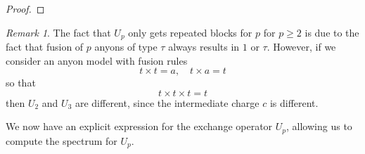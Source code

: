 \documentclass[a4paper,10pt,oneside]{book}
\theoremstyle{plain}
\theoremstyle{definition}
\theoremstyle{remark}
\newtheorem{remark}{Remark}[section]
\begin{document}
\begin{proof}
\end{proof}

\begin{remark}
  The fact that $U_p$ only gets repeated blocks for $p$ for $p \ge 2$ is due to the fact that fusion of $p$ anyons of type $τ$ always results in $1$ or $τ$. However, if we consider an anyon model with fusion rules
  \begin{equation}
    t \times t = a, \quad
    t \times a = t
  \end{equation}
  so that
  \begin{equation}
    t \times t \times t = t
  \end{equation}
  then $U_2$ and $U_3$ are different, since the intermediate charge $c$ is different.
\end{remark}

We now have an explicit expression for the exchange operator $U_p$, allowing us to compute the spectrum for $U_p$.
\end{document}
